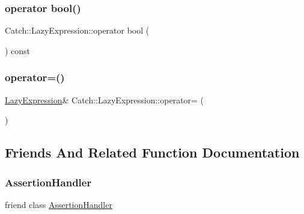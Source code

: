 \subsubsection{\texorpdfstring{operator bool()}{operator bool()}}
{\footnotesize\ttfamily Catch\+::\+Lazy\+Expression\+::operator bool (\begin{DoxyParamCaption}{ }\end{DoxyParamCaption}) const\hspace{0.3cm}{\ttfamily [explicit]}}

\mbox{\label{classCatch_1_1LazyExpression_ae4ae00d4f36f084c369f2da36565a822}} 
\subsubsection{\texorpdfstring{operator=()}{operator=()}}
{\footnotesize\ttfamily \mbox{\hyperlink{classCatch_1_1LazyExpression}{Lazy\+Expression}}\& Catch\+::\+Lazy\+Expression\+::operator= (\begin{DoxyParamCaption}\item[{\mbox{\hyperlink{classCatch_1_1LazyExpression}{Lazy\+Expression}} const \&}]{ }\end{DoxyParamCaption})\hspace{0.3cm}{\ttfamily [delete]}}



\subsection{Friends And Related Function Documentation}
\mbox{\label{classCatch_1_1LazyExpression_a4301a3aa57b612dd8b6ef8461742ecab}} 
\subsubsection{\texorpdfstring{Assertion\+Handler}{AssertionHandler}}
{\footnotesize\ttfamily friend class \mbox{\hyperlink{classCatch_1_1AssertionHandler}{Assertion\+Handler}}\hspace{0.3cm}{\ttfamily [friend]}}

